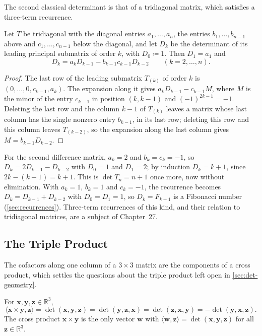 The second classical determinant is that of a tridiagonal matrix, which satisfies a three-term recurrence.

\begin{proposition}
\label{prop:tridiagonal-det}
Let $T$ be tridiagonal with the diagonal entries $a_1,\ldots,a_n$, the entries $b_1,\ldots,b_{n-1}$ above and $c_1,\ldots,c_{n-1}$ below the diagonal, and let $D_k$ be the determinant of its leading principal submatrix of order $k$, with $D_0\coloneqq1$. Then $D_1=a_1$ and
\[
D_k=a_kD_{k-1}-b_{k-1}c_{k-1}D_{k-2}\qquad(k=2,\ldots,n).
\]
\end{proposition}

\begin{proof}
The last row of the leading submatrix $T_{(k)}$ of order $k$ is $(0,\ldots,0,c_{k-1},a_k)$. The expansion along it gives $a_kD_{k-1}-c_{k-1}M$, where $M$ is the minor of the entry $c_{k-1}$ in position $(k,k-1)$ and $(-1)^{2k-1}=-1$. Deleting the last row and the column $k-1$ of $T_{(k)}$ leaves a matrix whose last column has the single nonzero entry $b_{k-1}$, in its last row; deleting this row and this column leaves $T_{(k-2)}$, so the expansion along the last column gives $M=b_{k-1}D_{k-2}$.
\end{proof}

For the second difference matrix, $a_k=2$ and $b_k=c_k=-1$, so $D_k=2D_{k-1}-D_{k-2}$ with $D_0=1$ and $D_1=2$; by induction $D_k=k+1$, since $2k-(k-1)=k+1$. This is $\det T_n=n+1$ once more, now without elimination. With $a_k=1$, $b_k=1$ and $c_k=-1$, the recurrence becomes $D_k=D_{k-1}+D_{k-2}$ with $D_0=D_1=1$, so $D_k=F_{k+1}$ is a Fibonacci number (\cref{sec:recurrences}). Three-term recurrences of this kind, and their relation to tridiagonal matrices, are a subject of Chapter~27.

\subsection{The Triple Product}

The cofactors along one column of a $3\times3$ matrix are the components of a cross product, which settles the questions about the triple product left open in \cref{sec:det-geometry}.

\begin{proposition}
\label{prop:triple-product}
For $\mathbf x,\mathbf y,\mathbf z\in\mathbb R^3$,
\[
\langle\mathbf x\times\mathbf y,\mathbf z\rangle=\det(\mathbf x,\mathbf y,\mathbf z)=\det(\mathbf y,\mathbf z,\mathbf x)=\det(\mathbf z,\mathbf x,\mathbf y)=-\det(\mathbf y,\mathbf x,\mathbf z).
\]
The cross product $\mathbf x\times\mathbf y$ is the only vector $\mathbf w$ with $\langle\mathbf w,\mathbf z\rangle=\det(\mathbf x,\mathbf y,\mathbf z)$ for all $\mathbf z\in\mathbb R^3$.
\end{proposition}

